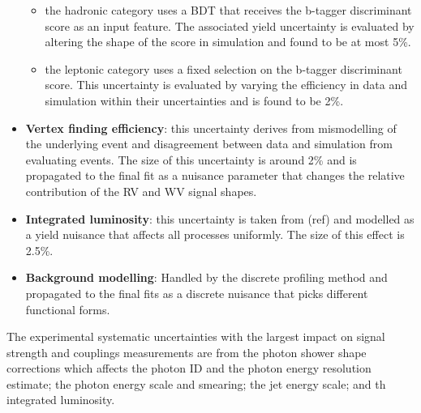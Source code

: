 \begin{itemize}[noitemsep]
{           \begin{itemize}[noitemsep]
               \item[\textbullet] the hadronic category uses a BDT that receives the b-tagger discriminant score as an input feature. The associated yield uncertainty is evaluated by altering the shape of the score in simulation and found to be at most 5\%.
               \item[\textbullet] the leptonic category uses a fixed selection on the b-tagger discriminant score. This uncertainty is evaluated by varying the efficiency in data and simulation within their uncertainties and is found to be 2\%.  
           \end{itemize}
           }
    \item {\textbf{Vertex finding efficiency}: 
           this uncertainty derives from mismodelling of the underlying event and disagreement between data and simulation from evaluating \Zmumu events. The size of this uncertainty is around 2\% and is propagated to the final fit as a nuisance parameter that changes the relative contribution of the RV and WV signal shapes.
           }
    \item {\textbf{Integrated luminosity}: 
        this uncertainty is taken from (ref) and modelled as a yield nuisance that affects all processes uniformly. The size of this effect is 2.5\%.
           }
    \item {\textbf{Background modelling}: 
           Handled by the discrete profiling method and propagated to the final fits as a discrete nuisance that picks different functional forms. 
           }
\end{itemize}

The experimental systematic uncertainties with the largest impact on signal strength and couplings measurements are from the photon shower shape corrections which affects the photon ID and the photon energy resolution estimate; the photon energy scale and smearing; the jet energy scale; and th integrated luminosity.









